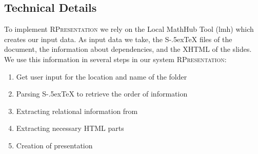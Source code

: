 \documentclass[twoside, 12pt]{article}
\def\stex{\texorpdfstring{\raisebox{-.5ex}S\kern-.5ex\TeX}{sTeX}\xspace}
\def\sTeX{\stex}
\newcommand{\sys}{\textsc{RPresentation}\xspace}
\begin{document}




\subsection{Technical Details}
\label{sec:wp4}

To implement \sys we rely on the Local MathHub Tool (lmh) which creates our input data. As input data we take, the \sTeX files of the document, the information about dependencies, and the XHTML of the slides. We use this information in several steps in our system \sys:

\begin{enumerate}
\item Get user input for the location and name of the folder
\item Parsing \sTeX to retrieve the order of information
\item Extracting relational information from 
\item Extracting necessary HTML parts
\item Creation of presentation
\end{enumerate}
\end{document}
